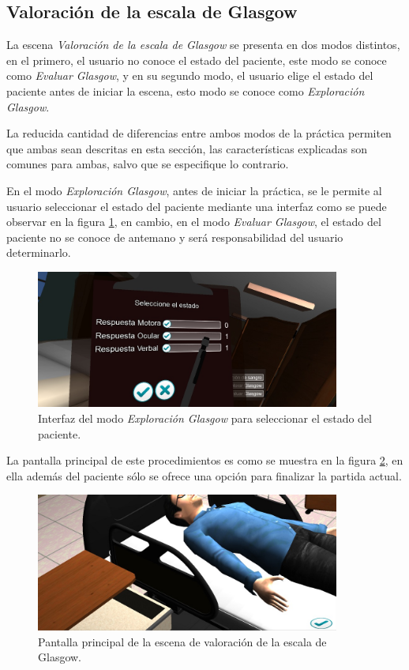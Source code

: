 \subsection{Valoración de la escala de Glasgow}

La escena  \emph{Valoración de la escala de Glasgow} %
se presenta en dos
modos distintos, en el primero, el usuario no conoce el estado del paciente,
este modo se conoce como \emph{Evaluar Glasgow}, y en su segundo modo, el
usuario elige el estado del paciente antes de iniciar la escena, esto modo
se conoce como \emph{Exploración Glasgow}. 

La reducida cantidad de diferencias entre ambos modos de la práctica permiten
que ambas sean descritas en esta sección, las características explicadas son
comunes para ambas, salvo que se especifique lo contrario.

En el modo \emph{Exploración Glasgow}, antes de iniciar la práctica, se le
permite al usuario seleccionar el estado del paciente mediante una interfaz 
como se puede observar en la figura \ref{fig:glasgow_seleccion}, en
cambio, en el modo \emph{Evaluar Glasgow}, el estado del paciente no se conoce
de antemano y será responsabilidad del usuario determinarlo.

\begin{figure}[H]
\centering
\includegraphics[width=10cm]{solucion/images/glasgow_seleccion.jpg}
\caption{Interfaz del modo \emph{Exploración Glasgow} para seleccionar el estado del 
paciente.}
\label{fig:glasgow_seleccion}
\end{figure}

La pantalla principal de este procedimientos es como se muestra en la figura
\ref{fig:glasgow_principal}, en ella además del paciente sólo se ofrece una
opción para finalizar la partida actual.

\begin{figure}[H]
\centering
\includegraphics[width=10cm]{solucion/images/glasgow_principal.jpg}
\caption{Pantalla principal de la escena de valoración de la escala de Glasgow.}
\label{fig:glasgow_principal}
\end{figure}

